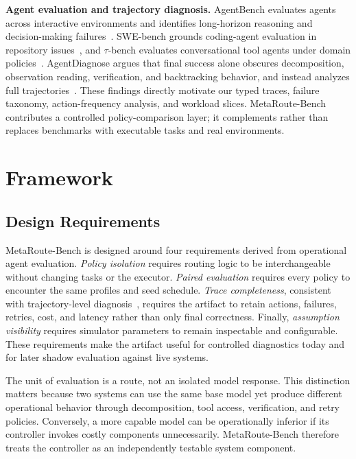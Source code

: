\documentclass[sigconf]{acmart}
\begin{document}
\textbf{Agent evaluation and trajectory diagnosis.} AgentBench evaluates agents across interactive environments and identifies long-horizon reasoning and decision-making failures~\cite{liu2024agentbench}. SWE-bench grounds coding-agent evaluation in repository issues~\cite{jimenez2024swebench}, and $\tau$-bench evaluates conversational tool agents under domain policies~\cite{yao2024taubench}. AgentDiagnose argues that final success alone obscures decomposition, observation reading, verification, and backtracking behavior, and instead analyzes full trajectories~\cite{ou2025agentdiagnose}. These findings directly motivate our typed traces, failure taxonomy, action-frequency analysis, and workload slices. MetaRoute-Bench contributes a controlled policy-comparison layer; it complements rather than replaces benchmarks with executable tasks and real environments.

\section{Framework}

\subsection{Design Requirements}

MetaRoute-Bench is designed around four requirements derived from operational agent evaluation. \emph{Policy isolation} requires routing logic to be interchangeable without changing tasks or the executor. \emph{Paired evaluation} requires every policy to encounter the same profiles and seed schedule. \emph{Trace completeness}, consistent with trajectory-level diagnosis~\cite{ou2025agentdiagnose}, requires the artifact to retain actions, failures, retries, cost, and latency rather than only final correctness. Finally, \emph{assumption visibility} requires simulator parameters to remain inspectable and configurable. These requirements make the artifact useful for controlled diagnostics today and for later shadow evaluation against live systems.

The unit of evaluation is a route, not an isolated model response. This distinction matters because two systems can use the same base model yet produce different operational behavior through decomposition, tool access, verification, and retry policies. Conversely, a more capable model can be operationally inferior if its controller invokes costly components unnecessarily. MetaRoute-Bench therefore treats the controller as an independently testable system component.
\end{document}
